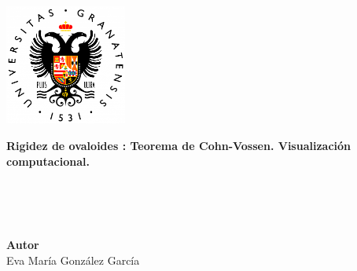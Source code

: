 \begin{titlepage}
 
 
\setlength{\centeroffset}{-0.5\oddsidemargin}
\addtolength{\centeroffset}{0.5\evensidemargin}
\thispagestyle{empty}

\noindent\hspace*{\centeroffset}\begin{minipage}{\textwidth}

\centering

% 

 \vspace{3.3cm}

\includegraphics[width=0.3\textwidth]{imagenes/logougr_new.png}\\[1.4cm]

 \vspace{0.5cm}


{\Huge\bfseries Rigidez de ovaloides : Teorema de Cohn-Vossen. Visualización computacional.\\
}
\end{minipage}
${ }$\\
${ }$\\
${ }$\\

\vspace{2.5cm}
\noindent\hspace*{\centeroffset}\begin{minipage}{\textwidth}
\centering

\textbf{Autor}\\ {Eva María González García}\\[2.5ex]


\end{minipage}
\end{titlepage}
